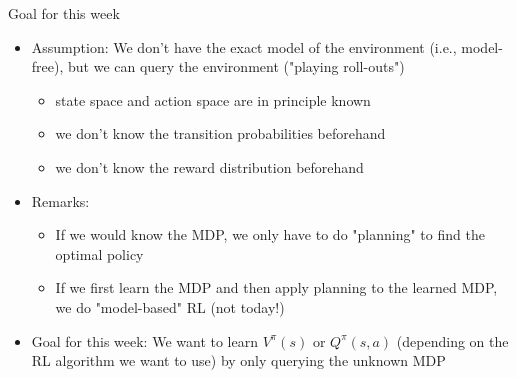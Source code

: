 \begin{frame}[c]{Goal for this week}

\begin{itemize}
	\item Assumption: We don't have the exact model of the environment (i.e., model-free), but we can query the environment ("playing roll-outs")
	\begin{itemize}
		\item state space and action space are in principle known
		\item we don't know the transition probabilities beforehand
		\item we don't know the reward distribution beforehand
	\end{itemize}
	\medskip
	\item Remarks:
	\begin{itemize}
		\item If we would know the MDP, we only have to do "planning" to find the optimal policy
		\item If we first learn the MDP and then apply planning to the learned MDP, we do "model-based" RL (not today!)
	\end{itemize}
	\medskip\pause
	\item Goal for this week: We want to learn $V^\pi(s)$ or $Q^\pi(s,a)$ (depending on the RL algorithm we want to use) by only querying the unknown MDP
\end{itemize}


\end{frame}


